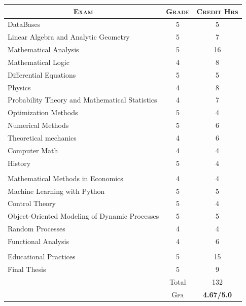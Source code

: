 \documentclass[a4paper,10pt]{article} %
\begin{document}
\begin{center}
\begin{tabular}{lcc}
\multicolumn{1}{c}{\textsc{Exam}} & \textsc{Grade}&\textsc{Credit Hrs}\\ \hline
DataBases & 5 & 5\\
Linear Algebra and Analytic Geometry & 5 & 7\\
Mathematical Analysis & 5 & 16\\
Mathematical Logic & 4 & 8\\
Differential Equations & 5 & 5\\
Physics	& 4 & 8\\	
Probability Theory and Mathematical Statistics & 4 & 7\\
Optimization Methods & 5 & 4\\
Numerical Methods & 5 & 6\\
Theoretical mechanics & 4 & 6\\
Computer Math & 4 & 4\\
History & 5 &	4\\ \\

Mathematical Methods in Economics & 4 & 4\\
Machine Learning with Python & 5 & 5\\
Control Theory & 5 & 4\\
Object-Oriented Modeling of Dynamic Processes & 5 & 5\\
Random Processes & 4 & 4\\
Functional Analysis	 & 4 & 6\\ \\

Educational Practices & 5 & 15\\		
Final Thesis & 5 & 9\\	
& Total & 132\\\cline{2-3}
&\textsc{Gpa}&\textbf{4.67/5.0}
\end{tabular}
\end{center}
\end{document}
